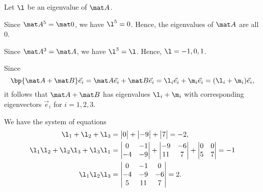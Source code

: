 \begin{solution}
    \begin{ppart}
        Let $\l$ be an eigenvalue of $\mat A$.

        \begin{psubpart}
            Since $\mat A^5 = \mat 0$, we have $\l^5 = 0$. Hence, the eigenvalues of $\mat A$ are all 0.
        \end{psubpart}
        \begin{psubpart}
            Since $\mat A^3 = \mat A$, we have $\l^3 = \l$. Hence, $\l = -1, 0, 1$.
        \end{psubpart}
    \end{ppart}
    \begin{ppart}
        \begin{psubpart}
            Since \[\bp{\mat A + \mat B} \vec e_i = \mat A \vec e_i + \mat B \vec e_i = \l_i \vec e_i + \m_i \vec e_i = (\l_i + \m_i) \vec e_i,\] it follows that $\mat A + \mat B$ has eigenvalues $\l_i + \m_i$ with corresponding eigenvectors $\vec e_i$ for $i = 1, 2, 3$.
        \end{psubpart}
        \begin{psubpart}
            We have the system of equations
            \begin{align*}
                \l_1 + \l_2 + \l_3 &= \begin{vmatrix}0\end{vmatrix} + \begin{vmatrix}-9\end{vmatrix} + \begin{vmatrix}7\end{vmatrix} = -2,\\
                \l_1 \l_2 + \l_2 \l_3 + \l_3 \l_1 &= \begin{vmatrix}0 & -1 \\ -4 & -9\end{vmatrix} + \begin{vmatrix}-9 & -6 \\ 11 & 7\end{vmatrix} + \begin{vmatrix}0 & 0 \\ 5 & 7\end{vmatrix} = -1 \\
                \l_1 \l_2 \l_3 &= \begin{vmatrix}0 & -1 & 0 \\ -4 & -9 & -6 \\ 5 & 11 & 7\end{vmatrix} = 2.
            \end{align*}
            

\end{psubpart}
\end{ppart}
\end{solution}
